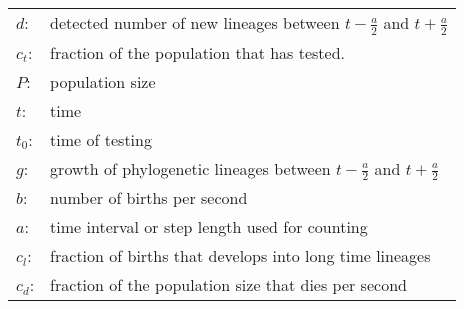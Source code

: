 \begin{tabular}{ll}
$d$:     & detected number of new lineages between $t-\frac{a}{2}$ and $t+\frac{a}{2}$\\
$c_t$:   & fraction of the population that has tested.\\
$P$:     & population size\\
$t$:     & time\\
$t_0$:   & time of testing\\
$g$:     & growth of phylogenetic lineages between $t-\frac{a}{2}$ and $t+\frac{a}{2}$\\
$b$:     & number of births per second\\
$a$:     & time interval or step length used for counting\\
$c_l$:   & fraction of births that develops into long time lineages\\
$c_{d}$: & fraction of the population size that dies per second
\end{tabular}
\vspace{1em}











